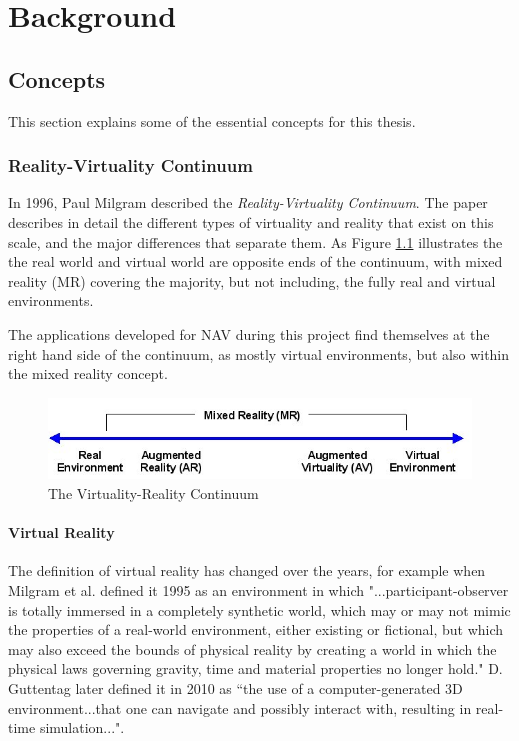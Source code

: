 
\chapter{Background}




\section{Concepts}
This section explains some of the essential concepts for this thesis.


\subsection{Reality-Virtuality Continuum} \label{background:Continuum}
In 1996, Paul Milgram described the \textit{Reality-Virtuality Continuum}\cite{milgram1995augmented}. The paper describes in detail the different types of virtuality and reality that exist on this scale, and the major differences that separate them. As Figure \ref{fig:VR_continuum} illustrates the the real world and virtual world are opposite ends of the continuum, with mixed reality (MR) covering the majority, but not including, the fully real and virtual environments. 

The applications developed for NAV during this project find themselves at the right hand side of the continuum, as mostly virtual environments, but also within the mixed reality concept.  

\begin{figure}
    \centering
    \includegraphics[width=\textwidth]{./fig/background/Virtuality_Continuum_2}
    \caption{The Virtuality-Reality Continuum}
    \label{fig:VR_continuum}
\end{figure}


\subsubsection{Virtual Reality}
The definition of virtual reality has changed over the years, for example when Milgram et al. defined it 1995 \cite{milgram1995augmented} as an environment in which "...participant-observer is totally immersed in a completely synthetic world, which may or may not mimic the properties of a real-world environment, either existing or fictional, but which may also exceed the bounds of physical reality by creating a world in which the physical laws governing gravity, time and material properties no longer hold." D. Guttentag \cite{guttentag2010virtual} later defined it in 2010 as “the use of a computer-generated 3D environment...that one can navigate and possibly interact with, resulting in real-time simulation...".

